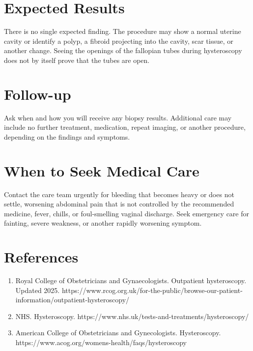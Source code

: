 \section*{Expected Results}
There is no single expected finding. The procedure may show a normal uterine cavity or identify a polyp, a fibroid projecting into the cavity, scar tissue, or another change. Seeing the openings of the fallopian tubes during hysteroscopy does not by itself prove that the tubes are open.

\section*{Follow-up}
Ask when and how you will receive any biopsy results. Additional care may include no further treatment, medication, repeat imaging, or another procedure, depending on the findings and symptoms.

\section*{When to Seek Medical Care}
Contact the care team urgently for bleeding that becomes heavy or does not settle, worsening abdominal pain that is not controlled by the recommended medicine, fever, chills, or foul-smelling vaginal discharge. Seek emergency care for fainting, severe weakness, or another rapidly worsening symptom.

\section*{References}
\begin{enumerate}
  \item Royal College of Obstetricians and Gynaecologists. Outpatient hysteroscopy. Updated 2025. https://www.rcog.org.uk/for-the-public/browse-our-patient-information/outpatient-hysteroscopy/
  \item NHS. Hysteroscopy. https://www.nhs.uk/tests-and-treatments/hysteroscopy/
  \item American College of Obstetricians and Gynecologists. Hysteroscopy. https://www.acog.org/womens-health/faqs/hysteroscopy
\end{enumerate}

\clearpage
